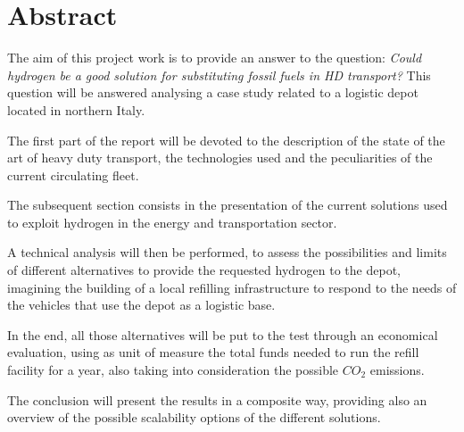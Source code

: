 \chapter*{Abstract} 
The aim of this project work is to provide an answer to the question: 
\textit{Could hydrogen be a good solution for substituting fossil fuels in HD transport?}
This question will be answered analysing a case study related to a logistic depot located in northern Italy.

The first part of the report will be devoted to the description of the state of the art of heavy duty transport, the technologies used and the peculiarities of the current circulating fleet.

The subsequent section consists in the presentation of the current solutions used to exploit hydrogen in the energy and transportation sector.

A technical analysis will then be performed, to assess the possibilities and limits of different alternatives to provide the requested hydrogen to the depot, imagining the building of a local refilling infrastructure to respond to the needs of the vehicles that use the depot as a logistic base.

In the end, all those alternatives will be put to the test through an economical evaluation, using as unit of measure the total funds needed to run the refill facility for a year, also taking into consideration the possible $CO_2$ emissions.

The conclusion will present the results in a composite way, providing also an overview of the possible scalability options of the different solutions.